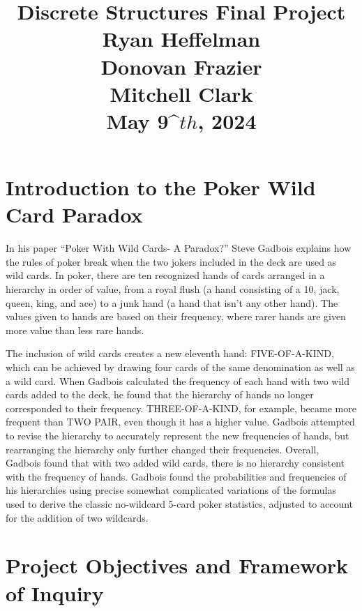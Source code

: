 \documentclass[16pt]{article}
\begin{document}
\large
\date{}
\title{\Large Discrete Structures Final Project \\ Ryan Heffelman \\ Donovan Frazier \\ Mitchell Clark \\ May 9^\(th\), 2024}
\maketitle
\section{Introduction to the Poker Wild Card Paradox} 

In his paper “Poker With Wild Cards- A Paradox?” Steve Gadbois explains how the rules of poker break when the two jokers included in the deck are used as wild cards. In poker, there are ten recognized hands of cards arranged in a hierarchy in order of value, from a royal flush (a hand consisting of a 10, jack, queen, king, and ace) to a junk hand (a hand that isn’t any other hand). The values given to hands are based on their frequency, where rarer hands are given more value than less rare hands. 

The inclusion of wild cards creates a new eleventh hand: FIVE-OF-A-KIND, which can be achieved by drawing four cards of the same denomination as well as a wild card. When Gadbois calculated the frequency of each hand with two wild cards added to the deck, he found that the hierarchy of hands no longer corresponded to their frequency. THREE-OF-A-KIND, for example, became more frequent than TWO PAIR, even though it has a higher value. Gadbois attempted to revise the hierarchy to accurately represent the new frequencies of hands, but rearranging the hierarchy only further changed their frequencies. Overall, Gadbois found that with two added wild cards, there is no hierarchy consistent with the frequency of hands. Gadbois found the probabilities and frequencies of his hierarchies using precise somewhat complicated variations of the formulas used to derive the classic no-wildcard 5-card poker statistics, adjusted to account for the addition of two wildcards.

\section{Project Objectives and Framework of Inquiry}
\end{document}
